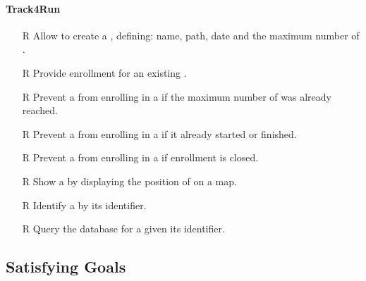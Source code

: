 \documentclass[../../rasd.tex]{subfiles}
\begin{document}
        \paragraph{Track4Run}
        \begin{itemize}
            \item[R\subs{39}]Allow  to create a , defining: name, path, date and the maximum number of . 
            \item[R\subs{40}]Provide  enrollment for an existing .
            \item[R\subs{41}]Prevent a  from enrolling in a  if the maximum number of  was already reached.
            \item[R\subs{42}]Prevent a  from enrolling in a  if it already started or finished.
            \item[R\subs{43}]Prevent a  from enrolling in a  if enrollment is closed.
            \item[R\subs{44}]Show a  by displaying the position of  on a map.
            \item[R\subs{45}]Identify a  by its identifier.
            \item[R\subs{46}]Query the database for a  given its identifier.
        \end{itemize}









        \subsection{Satisfying Goals}
\end{document}
